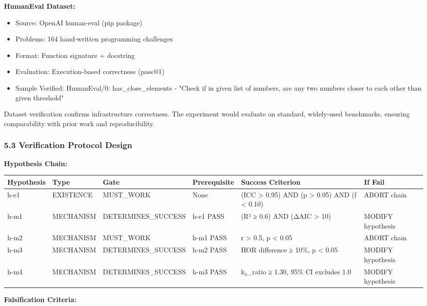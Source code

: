 \textbf{HumanEval Dataset:}
\begin{itemize}
\item Source: OpenAI human-eval (pip package)
\item Problems: 164 hand-written programming challenges
\item Format: Function signature + docstring
\item Evaluation: Execution-based correctness (pass@1)
\item Sample Verified: HumanEval/0: has_close_elements - "Check if in given list of numbers, are any two numbers closer to each other than given threshold"
\end{itemize}

Dataset verification confirms infrastructure correctness. The experiment would evaluate on standard, widely-used benchmarks, ensuring comparability with prior work and reproducibility.

\subsubsection{5.3 Verification Protocol Design}

\textbf{Hypothesis Chain:}

\begin{table}[htbp]
\centering
\begin{tabular}{llllll}
\toprule
Hypothesis & Type & Gate & Prerequisite & Success Criterion & If Fail \\
\midrule
h-e1 & EXISTENCE & MUST_WORK & None & (ICC > 0.95) AND (p > 0.05) AND (f < 0.10) & ABORT chain \\
h-m1 & MECHANISM & DETERMINES_SUCCESS & h-e1 PASS & (R² ≥ 0.6) AND (ΔAIC > 10) & MODIFY hypothesis \\
h-m2 & MECHANISM & MUST_WORK & h-m1 PASS & r > 0.5, p < 0.05 & ABORT chain \\
h-m3 & MECHANISM & DETERMINES_SUCCESS & h-m2 PASS & HOR difference ≥ 10\%, p < 0.05 & MODIFY hypothesis \\
h-m4 & MECHANISM & DETERMINES_SUCCESS & h-m3 PASS & k₂_ratio ≥ 1.30, 95\% CI excludes 1.0 & MODIFY hypothesis \\
\bottomrule
\end{tabular}
\end{table}

\textbf{Falsification Criteria:}

